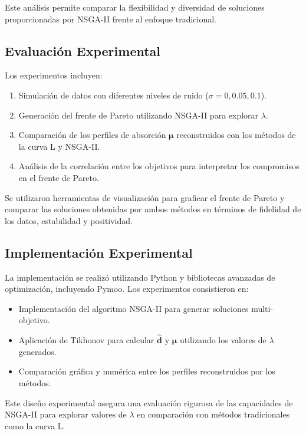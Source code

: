 Este análisis permite comparar la flexibilidad y diversidad de soluciones proporcionadas por NSGA-II frente al enfoque tradicional.

\subsection{Evaluación Experimental} \label{sec:method:evaluation}

Los experimentos incluyen:
\begin{enumerate}
    \item Simulación de datos con diferentes niveles de ruido (\( \sigma = 0, 0.05, 0.1 \)).
    \item Generación del frente de Pareto utilizando NSGA-II para explorar \( \lambda \).
    \item Comparación de los perfiles de absorción \( \mathbf{\mu} \) reconstruidos con los métodos de la curva L y NSGA-II.
    \item Análisis de la correlación entre los objetivos para interpretar los compromisos en el frente de Pareto.
\end{enumerate}

Se utilizaron herramientas de visualización para graficar el frente de Pareto y comparar las soluciones obtenidas por ambos métodos en términos de fidelidad de los datos, estabilidad y positividad.

\subsection{Implementación Experimental} \label{sec:method:implementation}

La implementación se realizó utilizando Python y bibliotecas avanzadas de optimización, incluyendo Pymoo. Los experimentos consistieron en:
\begin{itemize}
    \item Implementación del algoritmo NSGA-II para generar soluciones multi-objetivo.
    \item Aplicación de Tikhonov para calcular \( \hat{\mathbf{d}} \) y \( \mathbf{\mu} \) utilizando los valores de \( \lambda \) generados.
    \item Comparación gráfica y numérica entre los perfiles reconstruidos por los métodos.
\end{itemize}

Este diseño experimental asegura una evaluación rigurosa de las capacidades de NSGA-II para explorar valores de \( \lambda \) en comparación con métodos tradicionales como la curva L.
